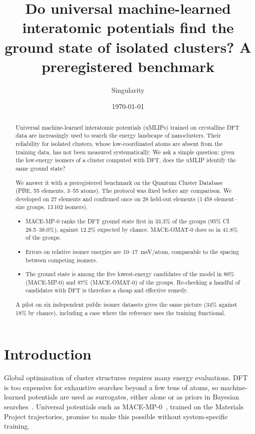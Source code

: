 \documentclass[11pt]{article}
\title{Do universal machine-learned interatomic potentials find the ground state of isolated clusters?
A preregistered benchmark}
\author{Singularity}
\date{\today}
\begin{document}
\maketitle

\begin{abstract}
Universal machine-learned interatomic potentials (uMLIPs) trained on crystalline DFT data are increasingly used to
search the energy landscape of nanoclusters. Their reliability for isolated clusters, whose low-coordinated atoms are
absent from the training data, has not been measured systematically. We ask a simple question: given the low-energy
isomers of a cluster computed with DFT, does the uMLIP identify the same ground state?

We answer it with a preregistered benchmark on the Quantum Cluster Database (PBE, 55 elements, 3--55 atoms). The
protocol was fixed before any comparison. We developed on 27 elements and confirmed once on 28 held-out elements
(1\,458 element--size groups, 13\,102 isomers).
\begin{itemize}
\item MACE-MP-0 ranks the DFT ground state first in 33.3\% of the groups (95\% CI 28.5--38.0\%), against 12.2\%
expected by chance. MACE-OMAT-0 does so in 41.8\% of the groups.
\item Errors on relative isomer energies are 10--17~meV/atom, comparable to the spacing between competing isomers.
\item The ground state is among the five lowest-energy candidates of the model in 80\% (MACE-MP-0) and 87\%
(MACE-OMAT-0) of the groups. Re-checking a handful of candidates with DFT is therefore a cheap and effective
remedy.
\end{itemize}
A pilot on six independent public isomer datasets gives the same picture (34\% against 18\% by chance), including
a case where the reference uses the training functional.
\end{abstract}

\section{Introduction}
Global optimisation of cluster structures requires many energy evaluations. DFT is too expensive for exhaustive
searches beyond a few tens of atoms, so machine-learned potentials are used as surrogates, either alone or as priors
in Bayesian searches~\cite{BEACON}. Universal potentials such as MACE-MP-0~\cite{MACEMP0}, trained on the Materials
Project trajectories, promise to make this possible without system-specific training.
\end{document}
